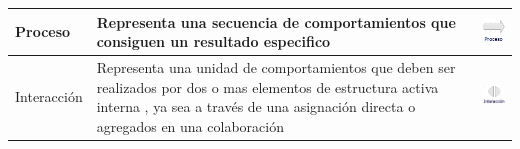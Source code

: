 \begin{table}[h!]
\begin{center}
\begin{tabular}{| m{6em} | m{7cm} | m{3cm} |}
		\hline
		Proceso
		& 
		Representa una secuencia de comportamientos que consiguen un resultado especifico
		& \includegraphics[width=0.8\linewidth, height=0.05\textheight]{imgs/conceptos/meta/Proceso.PNG}
		\\
		
		\hline
		Interacción  
		& 
		Representa una unidad de comportamientos que deben ser realizados por dos o mas elementos de estructura activa interna , ya sea a través de una asignación directa o agregados en una colaboración 
		& \includegraphics[width=0.8\linewidth, height=0.05\textheight]{imgs/conceptos/meta/Interaccion.PNG}
		\\
		

\end{tabular}
\end{center}
\end{table}
